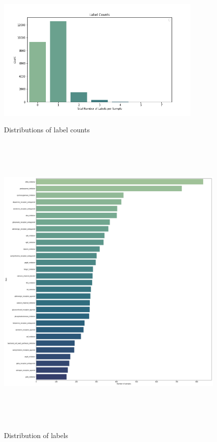 \documentclass[bsc,frontabs,twoside,singlespacing,parskip,deptreport]{infthesis}     %
\begin{document}
\begin{figure}[h!]
\caption{Distributions of label counts}
\includegraphics[height=6cm]{images/label_counts.png}\label{label_counts}
\end{figure}
\begin{figure}[h!]
\centering
\caption{Distribution of labels}
\includegraphics[height=15cm]{images/label_dist.png}\label{label_dist}
\end{figure}
\end{document}
